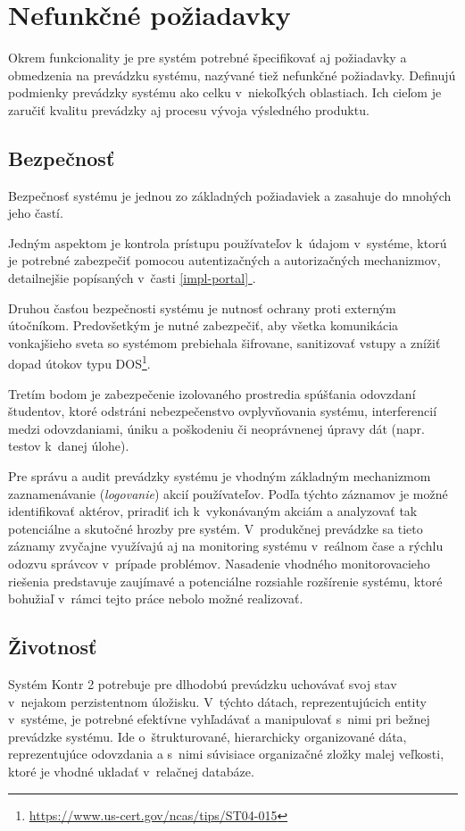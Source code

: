 \documentclass[
  digital, %
  oneside, %
  table,   %
  lof,     %
  lot,   %
]{fithesis3}
\newcommand*{\fullref}[1]{\hyperref[{#1}]{\ref*{#1} \nameref*{#1}}}
\begin{document}
\section{Nefunkčné požiadavky}

Okrem funkcionality je pre systém potrebné špecifikovať aj požiadavky a obmedzenia na prevádzku systému, nazývané tiež nefunkčné požiadavky. Definujú podmienky prevádzky systému ako celku v~niekoľkých oblastiach. Ich cieľom je zaručiť kvalitu prevádzky aj procesu vývoja výsledného produktu.

\subsection{Bezpečnosť}
Bezpečnosť systému je jednou zo základných požiadaviek a zasahuje do mnohých jeho častí.

Jedným aspektom je kontrola prístupu používateľov k~údajom v~systéme, ktorú je potrebné zabezpečiť pomocou autentizačných a autorizačných mechanizmov, detailnejšie popísaných v~časti \fullref{impl-portal}.

Druhou časťou bezpečnosti systému je nutnosť ochrany proti externým útočníkom. Predovšetkým je nutné zabezpečiť, aby všetka komunikácia vonkajšieho sveta so systémom prebiehala šifrovane, sanitizovať vstupy a znížiť dopad útokov typu DOS\footnote{\url{https://www.us-cert.gov/ncas/tips/ST04-015}}. 

Tretím bodom je zabezpečenie izolovaného prostredia spúšťania odovzdaní študentov, ktoré odstráni nebezpečenstvo ovplyvňovania systému, interferencií medzi odovzdaniami, úniku a poškodeniu či neoprávnenej úpravy dát (napr. testov k~danej úlohe).

Pre správu a audit prevádzky systému je vhodným základným mechanizmom zaznamenávanie (\emph{logovanie}) akcií používateľov. Podľa týchto záznamov je možné identifikovať aktérov, priradiť ich k~vykonávaným akciám a analyzovať tak potenciálne a skutočné hrozby pre systém. V~produkčnej prevádzke sa tieto záznamy zvyčajne využívajú aj na monitoring systému v~reálnom čase a rýchlu odozvu správcov v~prípade problémov. Nasadenie vhodného monitorovacieho riešenia predstavuje zaujímavé a potenciálne rozsiahle rozšírenie systému, ktoré bohužiaľ v~rámci tejto práce nebolo možné realizovať.

\subsection{Životnosť}
Systém Kontr 2 potrebuje pre dlhodobú prevádzku uchovávať svoj stav v~nejakom perzistentnom úložisku. V~týchto dátach, reprezentujúcich entity v~systéme, je potrebné efektívne vyhľadávať a manipulovať s~nimi pri bežnej prevádzke systému. Ide o~štrukturované, hierarchicky organizované dáta, reprezentujúce odovzdania a s~nimi súvisiace organizačné zložky malej veľkosti, ktoré je vhodné ukladať v~relačnej databáze\cite{fowler-pattern-application-arch}. 
\end{document}
